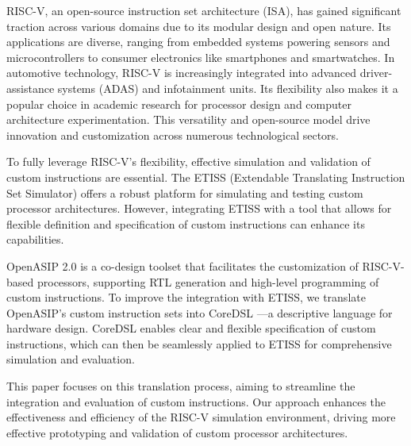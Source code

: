 RISC-V, an open-source instruction set architecture (ISA), has gained significant traction across various domains due to its modular design and open nature.
Its applications are diverse, ranging from embedded systems powering sensors and microcontrollers to consumer electronics like smartphones and smartwatches.
In automotive technology, RISC-V is increasingly integrated into advanced driver-assistance systems (ADAS) and infotainment units.
Its flexibility also makes it a popular choice in academic research for processor design and computer architecture experimentation.
This versatility and open-source model drive innovation and customization across numerous technological sectors. \cite{Risc-v}

To fully leverage RISC-V's flexibility, effective simulation and validation of custom instructions are essential.
The ETISS (Extendable Translating Instruction Set Simulator) \cite{ETISS} offers a robust platform for simulating and testing custom processor architectures.
However, integrating ETISS with a tool that allows for flexible definition and specification of custom instructions can enhance its capabilities.

OpenASIP 2.0 \cite{OpenASIP} is a co-design toolset that facilitates the customization of RISC-V-based processors,
supporting RTL generation and high-level programming of custom instructions.
To improve the integration with ETISS, we translate OpenASIP's custom instruction sets into CoreDSL \cite{CoreDSL}—a descriptive language for hardware design.
CoreDSL enables clear and flexible specification of custom instructions, which can then be seamlessly applied to ETISS for comprehensive simulation and evaluation.

This paper focuses on this translation process, aiming to streamline the integration and evaluation of custom instructions.
Our approach enhances the effectiveness and efficiency of the RISC-V simulation environment,
driving more effective prototyping and validation of custom processor architectures.
